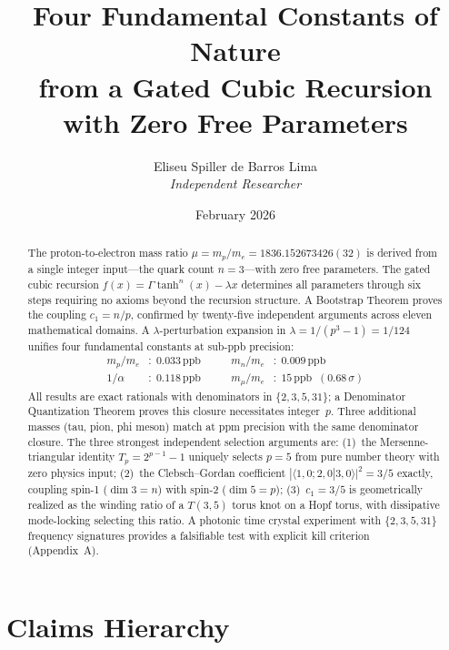 \documentclass[12pt,a4paper]{article}
\title{%
  Four Fundamental Constants of Nature\\
  from a Gated Cubic Recursion with Zero Free Parameters}
\author{Eliseu Spiller de Barros Lima\\
  \textit{Independent Researcher}}
\date{February 2026}
\theoremstyle{definition}
\newcommand{\ppb}{\,\mathrm{ppb}}
\begin{document}
\maketitle

\begin{abstract}
The proton-to-electron mass ratio $\mu = m_p/m_e = 1836.152673426(32)$ is
derived from a single integer input---the quark count $n = 3$---with
zero free parameters. The gated cubic recursion
$f(x) = \Gamma\tanh^n(x) - \lambda x$ determines all parameters through
six steps requiring no axioms beyond the recursion structure. A
Bootstrap Theorem proves the coupling $c_1 = n/p$, confirmed by
twenty-five independent arguments across eleven mathematical domains.
A $\lambda$-perturbation expansion in $\lambda = 1/(p^3-1) = 1/124$ unifies
four fundamental constants at sub-ppb precision:
\begin{align*}
  m_p/m_e &: \; 0.033\ppb &\qquad m_n/m_e &: \; 0.009\ppb \\
  1/\alpha &: \; 0.118\ppb &\qquad m_\mu/m_e &: \; 15\ppb \;\;(0.68\,\sigma)
\end{align*}
All results are exact rationals with denominators in $\{2, 3, 5, 31\}$;
a Denominator Quantization Theorem proves this closure necessitates
integer~$p$. Three additional masses (tau, pion, phi meson) match at
ppm precision with the same denominator closure. The three strongest
independent selection arguments are: (1)~the Mersenne-triangular
identity $T_p = 2^{p-1}-1$ uniquely selects $p = 5$ from pure number
theory with zero physics input; (2)~the Clebsch--Gordan coefficient
$|\langle 1,0;2,0|3,0\rangle|^2 = 3/5$ exactly, coupling spin-1
($\dim 3 = n$) with spin-2 ($\dim 5 = p$); (3)~$c_1 = 3/5$ is
geometrically realized as the winding ratio of a $T(3,5)$ torus knot
on a Hopf torus, with dissipative mode-locking selecting this ratio.
A photonic time crystal experiment with $\{2,3,5,31\}$ frequency
signatures provides a falsifiable test with explicit kill criterion
(Appendix~A).
\end{abstract}

\section*{Claims Hierarchy}
\end{document}
